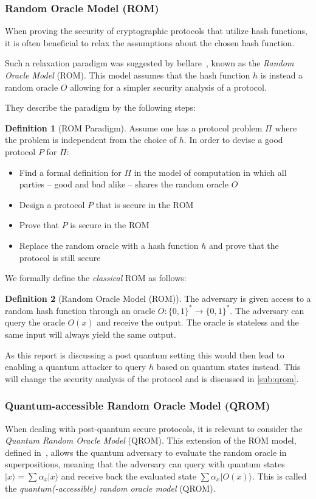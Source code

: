 \documentclass[11pt]{report}
\theoremstyle{definition}
\newtheorem{definition}{Definition}[section]
\theoremstyle{plain}
\begin{document}
\subsubsection{Random Oracle Model (ROM)}

When proving the security of cryptographic protocols that utilize hash functions, it is often beneficial to relax the assumptions about the chosen hash function.

Such a relaxation paradigm was suggested by bellare~\cite{bellare1993random}, known as the \textit{Random Oracle Model} (ROM). This model assumes that the hash function $h$ is instead a random oracle $O$ allowing for a simpler security analysis of a protocol.

They describe the paradigm by the following steps:
\begin{definition}[ROM Paradigm]
  Assume one has a protocol problem $\Pi$ where the problem is independent from the choice of $h$. In order to devise a good protocol $P$ for $\Pi$:
  \begin{itemize}
    \item Find a formal definition for $\Pi$ in the model of computation in which all parties -- good and bad alike -- shares the random oracle $O$
    \item Design a protocol $P$ that is secure in the ROM
    \item Prove that $P$ is secure in the ROM
    \item Replace the random oracle with a hash function $h$ and prove that the protocol is still secure
  \end{itemize}
\end{definition}

We formally define the \textit{classical} ROM as follows:
\begin{definition}[Random Oracle Model (ROM)]
  The adversary is given access to a random hash function through an oracle $O: \{0,1\}^* \rightarrow \{0,1\}^*$. The adversary can query the oracle $O(x)$ and receive the output. The oracle is stateless and the same input will always yield the same output.
\end{definition}

As this report is discussing a post quantum setting this would then lead to enabling a quantum attacker to query $h$ based on quantum states instead. This will change the security analysis of the protocol and is discussed in \autoref{sub:qrom}.

\subsubsection{Quantum-accessible Random Oracle Model (QROM)}\label{sub:qrom}
When dealing with post-quantum secure protocols, it is relevant to consider the \textit{Quantum Random Oracle Model} (QROM). This extension of the ROM model, defined in~\cite{boneh2011random}, allows the quantum adversary to evaluate the random oracle in superpositions, meaning that the adversary can query with quantum states $|x \rangle = \sum \alpha_x |x \rangle$ and receive back the evaluated state $\sum\alpha_x |O(x)\rangle$. This is called the \textit{quantum(-accessible) random oracle model} (QROM).
\end{document}
